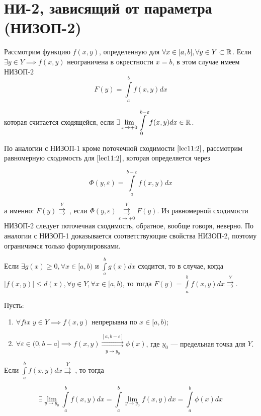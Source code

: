 \documentclass[../../main.tex]{subfiles}
\begin{document}
\section{НИ-2, зависящий от параметра (НИЗОП-2)}

	Рассмотрим функцию $f(x, y)$, определенную для $\forall x \in [a, b], \forall y \in Y \subset \mathbb{R}$. Если $\exists y \in Y \implies f(x, y)$ неограничена в окрестности $x = b$, в этом случае имеем НИЗОП-2 
	\begin{equation}\label{lec11:3}
		F(y) = \int\limits_a^b f(x, y) dx
	\end{equation}
	
	которая считается сходящейся, если $\displaystyle \exists \lim_{x \rightarrow +0} \int\limits_0^{b - \varepsilon} f(x, y) dx \in \mathbb{R}$.
	
	По аналогии с НИЗОП-1 кроме поточечной сходимости $\eqref{lec11:2}$, рассмотрим равномерную сходимость для $\eqref{lec11:2}$, которая определяется через 
	
	\begin{equation}\label{lec11:4}
		\Phi(y, \varepsilon) = \int\limits_a^{b - \varepsilon} f(x, y) dx
	\end{equation}
	
	а именно: $F(y) \overset{Y}\rightrightarrows\;$, если $\Phi(y, \varepsilon) \overset{Y}{\underset{\varepsilon \rightarrow +0}\rightrightarrows} F(y)$. Из равномерной сходимости НИЗОП-2 следует поточечная сходимость, обратное, вообще говоря, неверно. По аналогии с НИЗОП-1 доказывается соответствующие свойства НИЗОП-2, поэтому ограничимся только формулировками.
	
	\begin{thm}
		Если $\exists g(x) \geq 0, \forall x \in [a, b)$ и $\int\limits_a^b g(x) dx$ сходится, то в случае, когда $|f(x, y)| \leq d(x), \forall y \in Y, \forall x \in [a, b)$, то тогда $F(y) = \int\limits_a^b f(x, y) dx \overset{Y}{\rightrightarrows}$.
	\end{thm}
	
	\begin{thm}
		Пусть:
		
		\begin{enumerate}
			\item $\forall fix \; y \in Y \implies f(x, y)$ непрерывна по $x \in [a, b)$;
			\item $\forall \varepsilon \in (0, b - a] \implies f(x, y) \overset{[a, b - \varepsilon]}{\underset{y \rightarrow y_0}\rightrightarrows} \phi(x)$, где $y_0$ --- предельная точка для $Y$.
		\end{enumerate}
		
		Если $\int\limits_a^b f(x, y) dx \overset{Y}\rightrightarrows \;$, то тогда 
		
		\begin{equation}\label{lec11:5}
			\exists \lim_{y \rightarrow y_0} \int\limits_a^b f(x, y) dx = \int\limits_a^b \lim_{y \rightarrow y_0} f(x, y) dx = \int\limits_a^b \phi(x) dx
		\end{equation}
	\end{thm}
\end{document}
